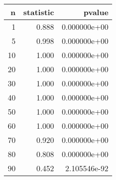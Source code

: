\begin{tabular}{rrr}
\toprule
  n &  statistic &        pvalue \\
\midrule
  1 &      0.888 &  0.000000e+00 \\
  5 &      0.998 &  0.000000e+00 \\
 10 &      1.000 &  0.000000e+00 \\
 20 &      1.000 &  0.000000e+00 \\
 30 &      1.000 &  0.000000e+00 \\
 40 &      1.000 &  0.000000e+00 \\
 50 &      1.000 &  0.000000e+00 \\
 60 &      1.000 &  0.000000e+00 \\
 70 &      0.920 &  0.000000e+00 \\
 80 &      0.808 &  0.000000e+00 \\
 90 &      0.452 &  2.105546e-92 \\
\bottomrule
\end{tabular}
